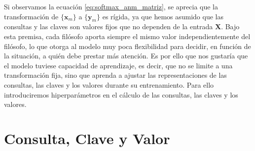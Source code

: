 Si observamos la ecuación \eqref{eq:softmax_anm_matriz}, se 
aprecia que la transformación de $\{\mathbf{x}_m\}$ a $\{\mathbf{y}_m\}$ es 
rígida, ya que hemos asumido que las consultas y las claves son valores fijos 
que no dependen de la entrada $\mathbf{X}$. Bajo esta premisa, cada filósofo 
aporta siempre el mismo valor independientemente del filósofo, lo que 
otorga al modelo muy poca flexibilidad para decidir, en función de la 
situación, a quién debe prestar más atención.  
Es por ello que nos gustaría que el modelo tuviese capacidad de aprendizaje, 
es decir, que no se limite a una transformación fija, sino que aprenda a 
ajustar las representaciones de las consultas, las claves y los valores 
durante su entrenamiento. Para ello introduciremos hiperparámetros en el cálculo
de las consultas, las claves y los valores.

\section{Consulta, Clave y Valor}

